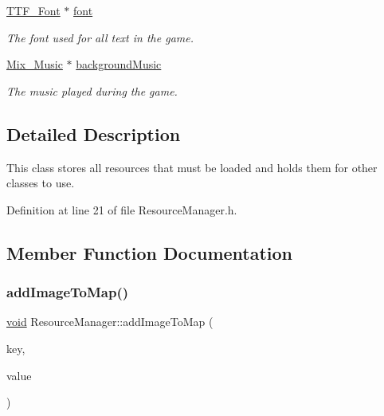 \begin{DoxyCompactItemize}
\mbox{\hyperlink{_s_d_l__ttf_8h_ac3b14e1c2946c0cf19776fe568d9abcf}{T\+T\+F\+\_\+\+Font}} $\ast$ \mbox{\hyperlink{class_resource_manager_a178a34ee6625bc871e701ff1df56d3ac}{font}}
\begin{DoxyCompactList}\small\item\em The font used for all text in the game. \end{DoxyCompactList}\item 
\mbox{\hyperlink{_s_d_l__mixer_8h_a1d58ae8fa29e1c03df23baeffb32b14c}{Mix\+\_\+\+Music}} $\ast$ \mbox{\hyperlink{class_resource_manager_a0ff25c7a84100edb4f62a24cd0226149}{background\+Music}}
\begin{DoxyCompactList}\small\item\em The music played during the game. \end{DoxyCompactList}\end{DoxyCompactItemize}


\subsection{Detailed Description}
This class stores all resources that must be loaded and holds them for other classes to use. 

Definition at line 21 of file Resource\+Manager.\+h.



\subsection{Member Function Documentation}
\mbox{\label{class_resource_manager_a7c4cd552ec084d3cf40906e46a2d3629}} 
\subsubsection{\texorpdfstring{addImageToMap()}{addImageToMap()}}
{\footnotesize\ttfamily \mbox{\hyperlink{_s_d_l__opengles2__gl2ext_8h_ae5d8fa23ad07c48bb609509eae494c95}{void}} Resource\+Manager\+::add\+Image\+To\+Map (\begin{DoxyParamCaption}\item[{int}]{key,  }\item[{\mbox{\hyperlink{struct_s_d_l___surface}{S\+D\+L\+\_\+\+Surface}} $\ast$}]{value }\end{DoxyParamCaption})}



